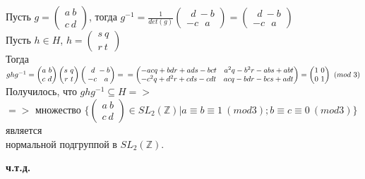 \documentclass[12pt,a4paper]{scrartcl}
\begin{document}
	Пусть $g = \begin{pmatrix}
	a~b\\
	c~d
	\end{pmatrix}$, тогда $g^{-1} = \frac{1}{det(g)} \begin{pmatrix}
	~~d~-b\\
	-c~~~a
	\end{pmatrix} = \begin{pmatrix}
	~~d~-b\\
	-c~~~a
	\end{pmatrix}$ \\
	
	Пусть $h \in H$,  $h = \begin{pmatrix}
	s~q\\
	r~t
	\end{pmatrix}$ \\
	
	Тогда $ghg^{-1} = \begin{pmatrix}
	a~b\\
	c~d
	\end{pmatrix} \begin{pmatrix}
	s~q\\
	r~t
	\end{pmatrix}\begin{pmatrix}
	~~d~-b\\
	-c~~~a
	\end{pmatrix} = \\
	
	=\begin{pmatrix}
	-acq+bdr+ads-bct~~~a^2q-b^2r-abs+abt\\
	-c^2q+d^2r+cds-cdt~~~acq-bdr-bcs+adt
	\end{pmatrix} = \begin{pmatrix}
	1~0\\
	0~1
	\end{pmatrix} ~ (mod~3)$ \\
	
	Получилось, что $ghg^{-1} \subseteq H =>$ \\
	
	$=>$ множество  $\{ \begin{pmatrix}
	a~b\\
	c~d
	\end{pmatrix} \in SL_2(\mathbb{Z}) |  a\equiv b\equiv1~(mod 3); b \equiv c\equiv 0~(mod 3)\}$ является \\
	
	нормальной подгруппой в $SL_2(\mathbb{Z})$.

	\begin{flushright}
		\textbf{ч.т.д.}
	\end{flushright}
\end{document}
